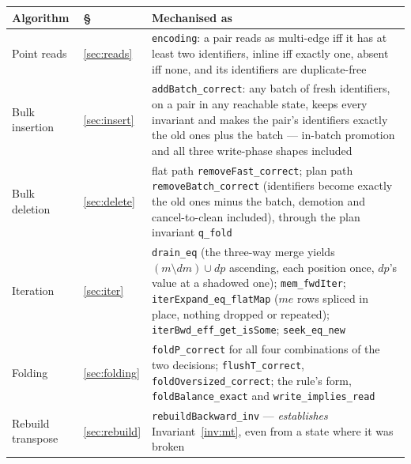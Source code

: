 \documentclass[11pt,a4paper]{article}
\theoremstyle{plain}
\theoremstyle{definition}
\theoremstyle{remark}
\begin{document}
\begin{table}[t]
\centering
\small
\begin{tabular}{@{}llp{7.2cm}@{}}
\toprule
Algorithm & \S & Mechanised as \\
\midrule
Point reads       & \ref{sec:reads}  & \texttt{encoding}: a pair reads as multi-edge iff
                                       it has at least two identifiers, inline iff exactly one,
                                       absent iff none, and its identifiers are duplicate-free \\
Bulk insertion    & \ref{sec:insert} & \texttt{addBatch\_correct}: any batch of fresh
                                       identifiers, on a pair in any reachable state, keeps every
                                       invariant and makes the pair's identifiers exactly the old
                                       ones plus the batch --- in-batch promotion and all three
                                       write-phase shapes included \\
Bulk deletion     & \ref{sec:delete} & flat path \texttt{removeFast\_correct}; plan path
                                       \texttt{removeBatch\_correct} (identifiers become exactly
                                       the old ones minus the batch, demotion and cancel-to-clean
                                       included), through the plan invariant \texttt{q\_fold} \\
Iteration         & \ref{sec:iter}   & \texttt{drain\_eq} (the three-way merge yields
                                       $(m\setminus dm)\cup dp$ ascending, each position once,
                                       $dp$'s value at a shadowed one); \texttt{mem\_fwdIter};
                                       \texttt{iterExpand\_eq\_flatMap} ($me$ rows spliced in place,
                                       nothing dropped or repeated); \texttt{iterBwd\_eff\_get\_isSome};
                                       \texttt{seek\_eq\_new} \\
Folding           & \ref{sec:folding}& \texttt{foldP\_correct} for all four combinations of the
                                       two decisions; \texttt{flushT\_correct},
                                       \texttt{foldOversized\_correct}; the rule's form,
                                       \texttt{foldBalance\_exact} and \texttt{write\_implies\_read} \\
Rebuild transpose & \ref{sec:rebuild}& \texttt{rebuildBackward\_inv} --- \emph{establishes}
                                       Invariant~\ref{inv:mt}, even from a state where it was broken \\

\end{tabular}
\end{table}
\end{document}
